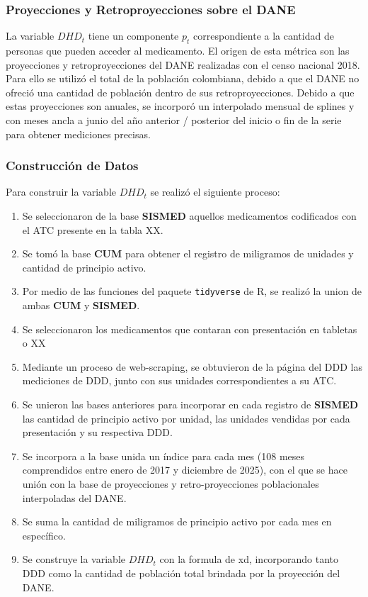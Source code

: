 \documentclass[10pt,twoside,xcolor=table,x11anmes]{IEEEtran}
\begin{document}
\subsubsection{Proyecciones y Retroproyecciones sobre el DANE}

La variable $DHD_t$ tiene un componente $p_t$ correspondiente a la cantidad de personas que pueden acceder al medicamento. El origen de esta métrica son las proyecciones y retroproyecciones del DANE realizadas con el censo nacional 2018. Para ello se utilizó el total de la población colombiana, debido a que el DANE no ofreció una cantidad de población dentro de sus retroproyecciones. Debido a que estas proyecciones son anuales, se incorporó un interpolado mensual de splines y con meses ancla a junio del año anterior / posterior del inicio o fin de la serie para obtener mediciones precisas. 

\subsubsection{Construcción de Datos}

Para construir la variable $DHD_t$ se realizó el siguiente proceso:

\begin{enumerate}
    \item Se seleccionaron de la base \textbf{SISMED} aquellos medicamentos codificados con el ATC presente en la tabla XX. 
    \item Se tomó la base \textbf{CUM} para obtener el registro de miligramos de unidades y cantidad de principio activo.
    \item Por medio de las funciones del paquete \texttt{tidyverse} de R, se realizó la union de ambas \textbf{CUM} y \textbf{SISMED}.
    \item Se seleccionaron los medicamentos que contaran con presentación en tabletas o XX
    \item Mediante un proceso de web-scraping, se obtuvieron de la página del DDD las mediciones de DDD, junto con sus unidades correspondientes a su ATC.
    \item Se unieron las bases anteriores para incorporar en cada registro de \textbf{SISMED} las cantidad de principio activo por unidad, las unidades vendidas por cada presentación y su respectiva DDD.
    \item Se incorpora a la base unida un índice para cada mes (108 meses comprendidos entre enero de 2017 y diciembre de 2025), con el que se hace unión con la base de proyecciones y retro-proyecciones poblacionales interpoladas del DANE.
    \item Se suma la cantidad de miligramos de principio activo por cada mes en específico.
    \item Se construye la variable $DHD_t$ con la formula de xd, incorporando tanto DDD como la cantidad de población total brindada por la proyección del DANE.
\end{enumerate}
\end{document}
